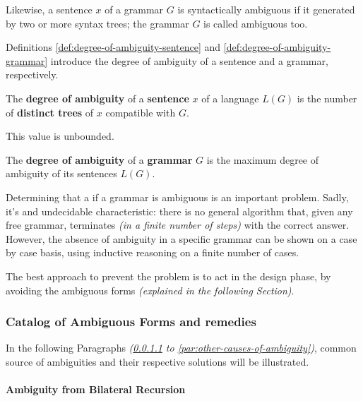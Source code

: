 \documentclass[english]{article}
\begin{document}
Likewise, a sentence \(x\) of a grammar \(G\) is syntactically ambiguous if it generated by two or more syntax trees;
the grammar \(G\) is called ambiguous too.

Definitions \ref{def:degree-of-ambiguity-sentence} and \ref{def:degree-of-ambiguity-grammar} introduce the degree of ambiguity of a sentence and a grammar, respectively.

\begin{definition}
  \label{def:degree-of-ambiguity-sentence}
  The \textbf{degree of ambiguity} of a \textbf{sentence} \(x\) of a language \(L(G)\) is the number of \textbf{distinct trees} of \(x\) compatible with \(G\).

  This value is unbounded.
\end{definition}

\begin{definition}
  \label{def:degree-of-ambiguity-grammar}
  The \textbf{degree of ambiguity} of a \textbf{grammar} \(G\) is the maximum degree of ambiguity of its sentences \(L(G)\).
\end{definition}

\bigskip
Determining that a if a grammar is ambiguous is an important problem.
Sadly, it's and undecidable characteristic: there is no general algorithm that, given any free grammar, terminates \textit{(in a finite number of steps)} with the correct answer.
However, the absence of ambiguity in a specific grammar can be shown on a case by case basis, using inductive reasoning on a finite number of cases.

The best approach to prevent the problem is to act in the design phase, by avoiding the ambiguous forms \textit{(explained in the following Section)}.

\subsubsection{Catalog of Ambiguous Forms and remedies}

In the following Paragraphs \textit{(\ref{par:ambiguity-from-bilateral-recursion} to \ref{par:other-causes-of-ambiguity})}, common source of ambiguities and their respective solutions will be illustrated.

\paragraph{Ambiguity from Bilateral Recursion}
\label{par:ambiguity-from-bilateral-recursion}
\end{document}

